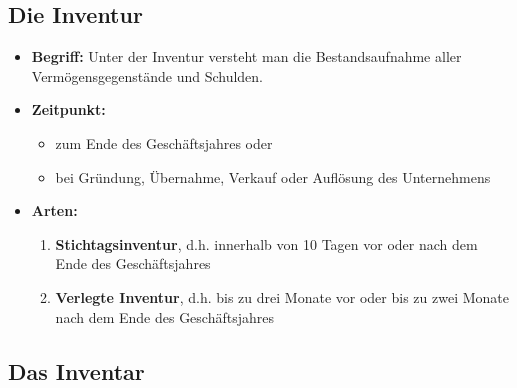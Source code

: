 \documentclass[a4paper,11pt]{scrartcl}	%
\begin{document}
	\subsection{Die Inventur}
		\begin{itemize}
			\item \textbf{Begriff:} Unter der Inventur versteht man die Bestandsaufnahme aller Vermögensgegenstände und Schulden.
			\item \textbf{Zeitpunkt:}
				\begin{itemize}
					\item zum Ende des Geschäftsjahres oder
					\item bei Gründung, Übernahme, Verkauf oder Auflösung des Unternehmens
				\end{itemize}				 
			\item \textbf{Arten:} 
				\begin{enumerate}
					\item \textbf{Stichtagsinventur}, d.h. innerhalb von 10 Tagen vor oder nach dem Ende des Geschäftsjahres
					\item \textbf{Verlegte Inventur}, d.h. bis zu drei Monate vor oder bis zu zwei Monate nach dem Ende des Geschäftsjahres
				\end{enumerate}
		\end{itemize}
		
	\subsection{Das Inventar}
	
	
\end{document}
